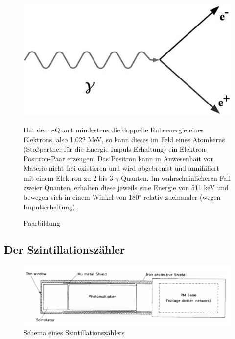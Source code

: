 \begin{figure}[H]
	\begin{minipage}{0.5\textwidth}
	\centering \includegraphics[width=\textwidth]{Bilder/Paarbildung.jpg}
	\caption{Paarbildung}
	\end{minipage}
	\begin{minipage}{0.5\textwidth}
	Hat der $\gamma$-Quant mindestens die doppelte Ruheenergie eines Elektrons, also 1.022 MeV, so kann dieses im Feld eines Atomkerns (Stoßpartner für die Energie-Impuls-Erhaltung) ein Elektron-Positron-Paar erzeugen. Das Positron kann in Anwesenhait von Materie nicht frei existieren und wird abgebremst und annihiliert mit einem Elektron zu 2 bis 3 $\gamma$-Quanten. Im wahrscheinlicheren Fall zweier Quanten, erhalten diese jeweils eine Energie von 511 keV und bewegen sich in einem Winkel von 180$^\circ$ relativ zueinander (wegen Impulserhaltung).
	\end{minipage}
\end{figure}

\subsection{Der Szintillationszähler}

\begin{figure}[H]
	\centering \includegraphics[width=\textwidth]{Bilder/Szinti.png}
	\caption{Schema eines Szintillationszählers}
\end{figure}

